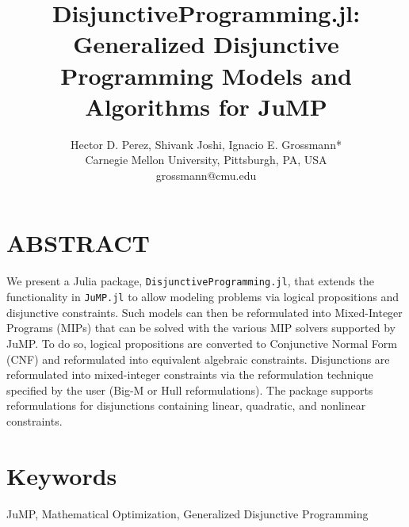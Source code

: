 \documentclass{juliacon}
\begin{document}
\title{DisjunctiveProgramming.jl: Generalized Disjunctive Programming Models and Algorithms for JuMP}
\author{
  \large Hector D. Perez, Shivank Joshi, Ignacio E. Grossmann*
  \\\normalsize Carnegie Mellon University, Pittsburgh, PA, USA  
  \\\normalsize	*grossmann@cmu.edu
}

\maketitle

\section*{ABSTRACT}
We present a Julia package, \verb|DisjunctiveProgramming.jl|, that extends the functionality in \verb|JuMP.jl| to allow modeling problems via logical propositions and disjunctive constraints. Such models can then be reformulated into Mixed-Integer Programs (MIPs) that can be solved with the various MIP solvers supported by JuMP. To do so, logical propositions are converted to Conjunctive Normal Form (CNF) and reformulated into equivalent algebraic constraints. Disjunctions are reformulated into mixed-integer constraints via the reformulation technique specified by the user (Big-M or Hull reformulations). The package supports reformulations for disjunctions containing linear, quadratic, and nonlinear constraints.

\section*{Keywords}
JuMP, Mathematical Optimization, Generalized Disjunctive Programming
\end{document}
